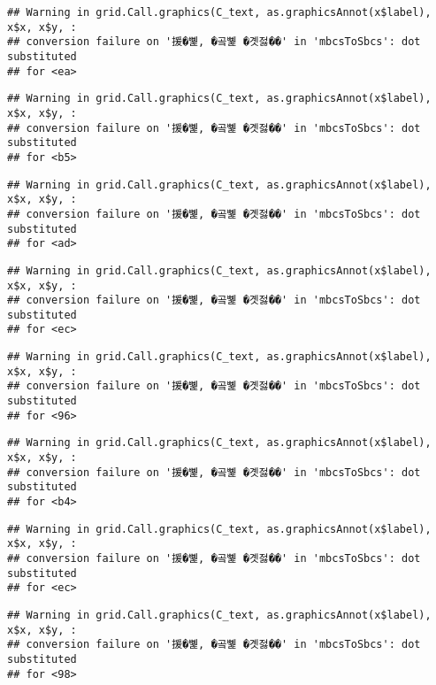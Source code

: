 \documentclass[
]{article}
\begin{document}
\begin{verbatim}
## Warning in grid.Call.graphics(C_text, as.graphicsAnnot(x$label), x$x, x$y, :
## conversion failure on '援�뼱, �곸뼱 �곗젏��' in 'mbcsToSbcs': dot substituted
## for <ea>
\end{verbatim}

\begin{verbatim}
## Warning in grid.Call.graphics(C_text, as.graphicsAnnot(x$label), x$x, x$y, :
## conversion failure on '援�뼱, �곸뼱 �곗젏��' in 'mbcsToSbcs': dot substituted
## for <b5>
\end{verbatim}

\begin{verbatim}
## Warning in grid.Call.graphics(C_text, as.graphicsAnnot(x$label), x$x, x$y, :
## conversion failure on '援�뼱, �곸뼱 �곗젏��' in 'mbcsToSbcs': dot substituted
## for <ad>
\end{verbatim}

\begin{verbatim}
## Warning in grid.Call.graphics(C_text, as.graphicsAnnot(x$label), x$x, x$y, :
## conversion failure on '援�뼱, �곸뼱 �곗젏��' in 'mbcsToSbcs': dot substituted
## for <ec>
\end{verbatim}

\begin{verbatim}
## Warning in grid.Call.graphics(C_text, as.graphicsAnnot(x$label), x$x, x$y, :
## conversion failure on '援�뼱, �곸뼱 �곗젏��' in 'mbcsToSbcs': dot substituted
## for <96>
\end{verbatim}

\begin{verbatim}
## Warning in grid.Call.graphics(C_text, as.graphicsAnnot(x$label), x$x, x$y, :
## conversion failure on '援�뼱, �곸뼱 �곗젏��' in 'mbcsToSbcs': dot substituted
## for <b4>
\end{verbatim}

\begin{verbatim}
## Warning in grid.Call.graphics(C_text, as.graphicsAnnot(x$label), x$x, x$y, :
## conversion failure on '援�뼱, �곸뼱 �곗젏��' in 'mbcsToSbcs': dot substituted
## for <ec>
\end{verbatim}

\begin{verbatim}
## Warning in grid.Call.graphics(C_text, as.graphicsAnnot(x$label), x$x, x$y, :
## conversion failure on '援�뼱, �곸뼱 �곗젏��' in 'mbcsToSbcs': dot substituted
## for <98>
\end{verbatim}
\end{document}
